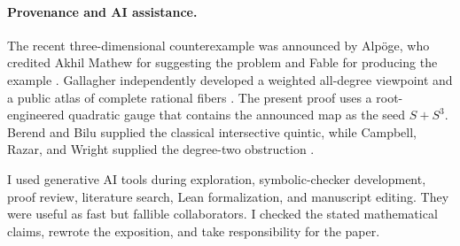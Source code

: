 \paragraph{Provenance and AI assistance.}
The recent three-dimensional counterexample was announced by Alp\"oge, who
credited Akhil Mathew for suggesting the problem and Fable for producing the
example \cite{Alpoge}.  Gallagher independently developed a weighted
all-degree viewpoint and a public atlas of complete rational fibers
\cite{Gallagher}.  The present proof uses a root-engineered quadratic gauge
that contains the announced map as the seed $S+S^3$.  Berend and Bilu supplied
the classical intersective quintic, while Campbell, Razar, and Wright supplied
the degree-two obstruction \cite{Campbell,Razar,Wright}.

I used generative AI tools during exploration, symbolic-checker development,
proof review, literature search, Lean formalization, and manuscript editing.
They were useful as fast but fallible collaborators.  I checked the stated
mathematical claims, rewrote the exposition, and take responsibility for the
paper.

